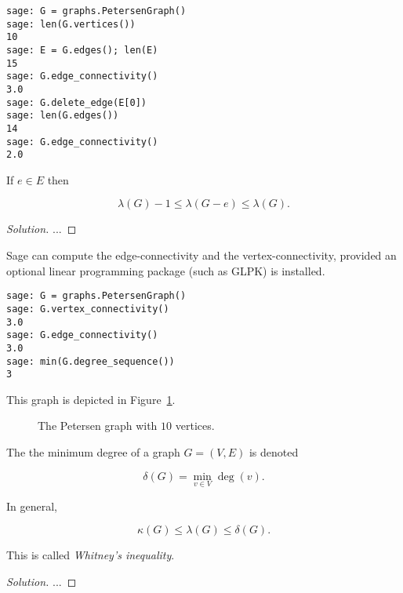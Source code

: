 \begin{lstlisting}
sage: G = graphs.PetersenGraph()
sage: len(G.vertices())
10
sage: E = G.edges(); len(E)
15
sage: G.edge_connectivity()
3.0
sage: G.delete_edge(E[0])
sage: len(G.edges())
14
sage: G.edge_connectivity()
2.0
\end{lstlisting}

\begin{lemma}
{\rm
If $e\in E$ then

\[
\lambda(G)-1\leq \lambda(G-e)\leq \lambda(G).
\]
}
\end{lemma}

\begin{proof}[Solution]

...

\end{proof}

\begin{example}
{\rm
Sage can compute the edge-connectivity and the vertex-connectivity,
provided an optional linear programming package
(such as GLPK) is installed.

\begin{lstlisting}
sage: G = graphs.PetersenGraph()
sage: G.vertex_connectivity()
3.0
sage: G.edge_connectivity()
3.0
sage: min(G.degree_sequence())
3
\end{lstlisting}
%
This graph is depicted in Figure~\ref{fig:distance_connectivity:petersen_graph}.

\begin{figure}[!htbp]
\centering

\caption{The Petersen graph with $10$ vertices.}
\label{fig:distance_connectivity:petersen_graph}
\end{figure}
}
\end{example}
The the minimum degree of a graph $G=(V,E)$ is
denoted

\[
\delta(G) = \min_{v\in V} \deg(v).
\]

\begin{proposition}
{\rm
In general,

\[
\kappa(G)\leq \lambda(G)\leq \delta(G).
\]
}
\end{proposition}

This is called {\it Whitney's inequality}.

\begin{proof}[Solution]

...

\end{proof}

